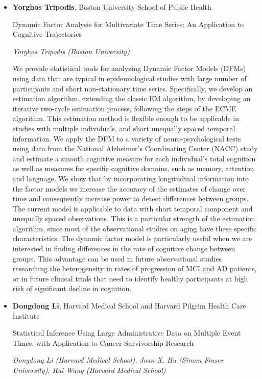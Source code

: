 \begin{itemize}
\item \textbf{Yorghos Tripodis}, Boston University School of Public Health

Dynamic Factor Analysis for Multivariate Time Series: An Application to Cognitive Trajectories

\emph{\footnotesize Yorghos Tripodis (Boston University)}

We provide statistical tools for analyzing Dynamic Factor Models (DFMs) using data that are typical in epidemiological studies with large number of participants and short non-stationary time series. Specifically, we develop an estimation algorithm, extending the classic EM algorithm, by developing an iterative two-cycle estimation process, following the steps of the ECME algorithm. This estimation method is flexible enough to be applicable in studies with multiple individuals, and short unequally spaced temporal information. We apply the DFM to a variety of neuro-psychological tests using data from the National Alzheimer’s Coordinating Center (NACC) study and estimate a smooth cognitive measure for each individual’s total cognition as well as measures for specific cognitive domains, such as memory, attention and language.  We show that by incorporating longitudinal information into the factor models we increase the accuracy of the estimates of change over time and consequently increase power to detect differences between groups.  The current model is applicable to data with short temporal component and unequally spaced observations. This is a particular strength of the estimation algorithm, since most of the observational studies on aging have these specific characteristics. The dynamic factor model is particularly useful when we are interested in finding differences in the rate of cognitive change between groups. This advantage can be used in future observational studies researching the heterogeneity in rates of progression of MCI and AD patients, or in future clinical trials that need to identify healthy participants at high risk of significant decline in cognition.

\item \textbf{Dongdong Li}, Harvard Medical School and Harvard Pilgrim Health Care Institute

Statistical Inference Using Large Administrative Data on Multiple Event Times, with Application to Cancer Survivorship Research

\emph{\footnotesize Dongdong Li (Harvard Medical School), Joan X. Hu (Simon Fraser University), Rui Wang (Harvard Medical School)}


\end{itemize}
